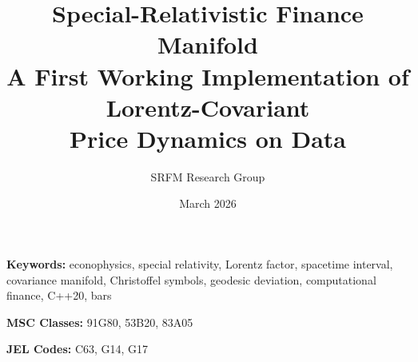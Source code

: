 \documentclass[11pt, letterpaper]{article}
\title{%
  \textbf{Special-Relativistic Finance Manifold}\\
  \large A First Working Implementation of Lorentz-Covariant\\
  Price Dynamics on \ohlcv{} Data
}
\author[1]{SRFM Research Group}
\affil[1]{%
  Computational Finance Laboratory \\
  \texttt{arXiv:2026.XXXXX [q-fin.CP]}
}
\date{March 2026}
\begin{document}
\maketitle
\thispagestyle{empty}



\vspace{0.5em}
\noindent
\textbf{Keywords:} econophysics, special relativity, Lorentz factor, spacetime
interval, covariance manifold, Christoffel symbols, geodesic deviation,
computational finance, C++20, \ohlcv{} bars

\noindent
\textbf{MSC Classes:} 91G80, 53B20, 83A05

\noindent
\textbf{JEL Codes:} C63, G14, G17

\tableofcontents
\clearpage


\clearpage


\clearpage


\clearpage


\clearpage


\clearpage


\clearpage


\clearpage



\end{document}

